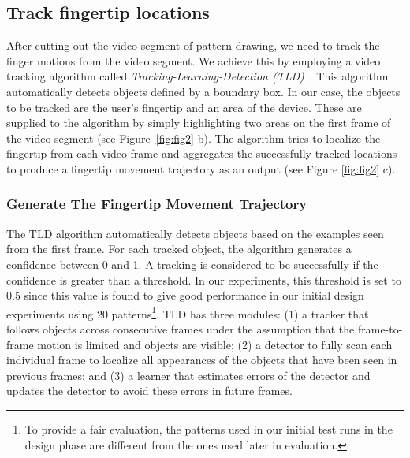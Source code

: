 \subsection{Track fingertip locations}
\label{section:tld}

        After cutting out the video segment of pattern drawing, we need to track the finger motions from the video segment. We achieve this by employing a video tracking algorithm called
        \emph{Tracking-Learning-Detection (TLD)}~\cite{kalal2012tracking}. This
        algorithm automatically detects objects defined by a boundary box. In
        our case, the objects to be tracked are the user's fingertip and an area of the device.
        These are supplied to the algorithm by simply highlighting two areas on the first frame of the video segment (see Figure~\ref{fig:fig2} b). The
        algorithm tries to localize the fingertip from each video frame and aggregates the successfully tracked locations to produce a fingertip movement trajectory as an output (see Figure
        \ref{fig:fig2} c).

    \subsubsection{Generate The Fingertip Movement Trajectory}

        The TLD algorithm automatically detects
        objects based on the examples seen from the first frame.
        For each tracked object, the algorithm generates a confidence between 0 and 1.
        A tracking is considered to be successfully if the confidence is greater than a threshold.
        In our experiments, this threshold is set to 0.5 since this value is found to give good performance in our initial design experiments using 20 patterns\footnote{To provide a fair evaluation, the patterns used in
        our initial test runs in
        the design phase are different from the ones used later in evaluation.}.
        TLD has three modules: (1) a tracker that follows
        objects across consecutive frames under the assumption
        that the frame-to-frame motion is limited and objects are visible;
        (2) a detector to fully scan each individual frame to localize all
        appearances of the objects that have been seen in previous frames; and
        (3) a learner that estimates errors of the detector and updates the detector to avoid these errors in future
        frames.



